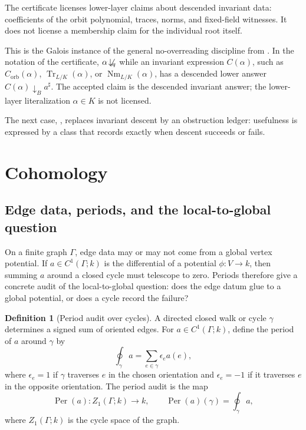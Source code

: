 \documentclass[11pt]{article}
\newcommand{\down}{\downarrow}
\newcommand{\ndown}{\not\!\downarrow}
\newcommand{\Tr}{\operatorname{Tr}}
\newcommand{\Nm}{\operatorname{Nm}}
\newcommand{\Per}{\operatorname{Per}}
\theoremstyle{definition}
\newtheorem{definition}[theorem]{Definition}
\begin{document}
The certificate licenses lower-layer claims about descended invariant data:
coefficients of the orbit polynomial, traces, norms, and fixed-field witnesses.
It does not license a membership claim for the individual root itself.

This is the Galois instance of the general no-overreading discipline from
.  In the notation of the certificate,
\(\alpha \ndown_q\) while an invariant expression \(C(\alpha)\), such as
\(C_{\mathrm{orb}}(\alpha)\), \(\Tr_{L/K}(\alpha)\), or \(\Nm_{L/K}(\alpha)\),
has a descended lower answer \(C(\alpha)\down_B a^\sharp\).  The accepted claim
is the descended invariant answer; the lower-layer literalization
\(\alpha\in K\) is not licensed.

The next case, , replaces invariant descent by an
obstruction ledger: usefulness is expressed by a class that records exactly when
descent succeeds or fails.
 \section{Cohomology}\label{sec:cohomology}

\subsection{Edge data, periods, and the local-to-global question}
\label{subsec:coh-edge-data-periods}

On a finite graph \(\Gamma\), edge data may or may not come from a global
vertex potential.  If \(a\in C^1(\Gamma;k)\) is the differential of a potential
\(\phi:V\to k\), then summing \(a\) around a closed cycle must telescope to
zero.  Periods therefore give a concrete audit of the local-to-global question:
does the edge datum glue to a global potential, or does a cycle record the
failure?

\begin{definition}[Period audit over cycles]
\label{def:coh-period-audit}
A directed closed walk or cycle \(\gamma\) determines a signed sum of oriented edges.  For \(a\in C^1(\Gamma;k)\), define the period of \(a\) around \(\gamma\) by
\[
\oint_\gamma a
=
\sum_{e\in \gamma}\epsilon_e a(e),
\]
where \(\epsilon_e=1\) if \(\gamma\) traverses \(e\) in the chosen orientation and \(\epsilon_e=-1\) if it traverses \(e\) in the opposite orientation.  The period audit is the map
\[
\Per(a):Z_1(\Gamma;k)\to k,
\qquad
\Per(a)(\gamma)=\oint_\gamma a,
\]
where \(Z_1(\Gamma;k)\) is the cycle space of the graph.
\end{definition}
\end{document}
